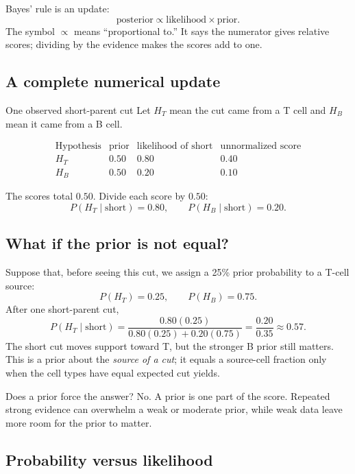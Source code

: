 \documentclass[11pt]{article}
\begin{document}
\begin{bigidea}
Bayes' rule is an update:
\[
\boxed{\text{posterior}\propto\text{likelihood}\times\text{prior}.}
\]
The symbol \(\propto\) means “proportional to.” It says the numerator gives
relative scores; dividing by the evidence makes the scores add to one.
\end{bigidea}

\subsection{A complete numerical update}

\begin{worked}{One observed short-parent cut}
Let \(H_T\) mean the cut came from a T cell and \(H_B\) mean it came from a B cell.

\[
\begin{array}{c|c|c|c}
\text{Hypothesis} & \text{prior} & \text{likelihood of short} & \text{unnormalized score}\\
\hline
H_T & 0.50 & 0.80 & 0.40\\
H_B & 0.50 & 0.20 & 0.10
\end{array}
\]

The scores total \(0.50\). Divide each score by \(0.50\):
\[
P(H_T\mid\text{short})=0.80,\qquad
P(H_B\mid\text{short})=0.20.
\]
\end{worked}

\subsection{What if the prior is not equal?}

Suppose that, before seeing this cut, we assign a 25\% prior probability to a
T-cell source:
\[
P(H_T)=0.25,\qquad P(H_B)=0.75.
\]
After one short-parent cut,
\[
P(H_T\mid\text{short})
=
\frac{0.80(0.25)}{0.80(0.25)+0.20(0.75)}
=
\frac{0.20}{0.35}
\approx0.57.
\]
The short cut moves support toward T, but the stronger B prior still matters.
This is a prior about the \emph{source of a cut}; it equals a source-cell fraction
only when the cell types have equal expected cut yields.

\begin{checkpoint}
Does a prior force the answer? No. A prior is one part of the score. Repeated
strong evidence can overwhelm a weak or moderate prior, while weak data leave
more room for the prior to matter.
\end{checkpoint}

\subsection{Probability versus likelihood}
\end{document}
